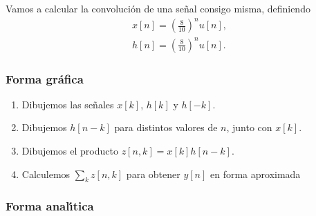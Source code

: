 Vamos a calcular la convolución de una señal consigo misma, definiendo
\begin{eqnarray}
  x\left[ n\right] =\left( \frac{8}{10}\right)^n u\left[ n\right] ,       \\
  h\left[ n\right] =\left( \frac{8}{10}\right)^n u\left[ n\right] .
\end{eqnarray}

\subsubsection{Forma gr\'{a}fica}

\begin{enumerate}
\item Dibujemos las se\~{n}ales $x[k]$, $h[k]$ y $h[-k]$.
        
\item Dibujemos $h[n-k]$ para distintos valores de $n$, junto con
  $x[k]$.
        
\item Dibujemos el producto $z[n,k] = x[k] h[n-k]$.
        
\item Calculemos $\sum_{k}z[n,k]$ para obtener $y[n]$ en forma
  aproximada
\end{enumerate}

\subsubsection{Forma anal\'{\i}tica}

